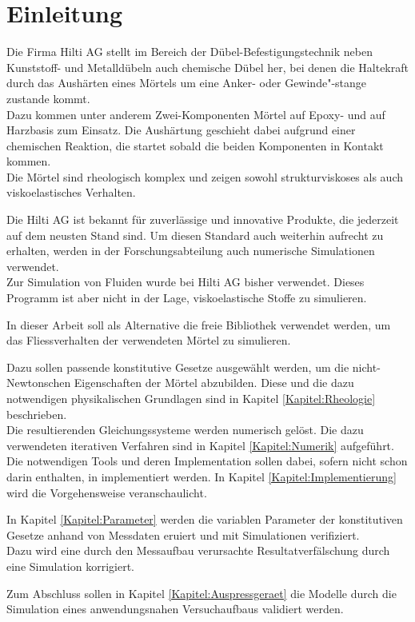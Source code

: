 \section{Einleitung}
\label{Kapitel:Einleitung}
Die Firma Hilti AG stellt im Bereich der Dübel-Befestigungstechnik neben Kunststoff- und Metalldübeln auch chemische Dübel her, bei denen die Haltekraft durch das Aushärten eines Mörtels um eine Anker- oder Gewinde"-stange zustande kommt. \\
Dazu kommen unter anderem Zwei-Komponenten Mörtel auf Epoxy- und auf Harzbasis zum Einsatz. Die Aushärtung geschieht dabei aufgrund einer chemischen Reaktion, die startet sobald die beiden Komponenten in Kontakt kommen.\\
Die Mörtel sind rheologisch komplex und zeigen sowohl strukturviskoses als auch viskoelastisches Verhalten.%

Die Hilti AG ist bekannt für zuverlässige und innovative Produkte, die jederzeit auf dem neusten Stand sind. Um diesen Standard auch weiterhin aufrecht zu erhalten, werden in der Forschungsabteilung auch numerische Simulationen verwendet.\\
Zur Simulation von Fluiden wurde bei Hilti AG bisher \cfx{} verwendet. Dieses Programm ist aber nicht in der Lage, viskoelastische Stoffe zu simulieren.%

In dieser Arbeit soll als Alternative die freie Bibliothek \openfoam{} verwendet werden, um das Fliessverhalten der verwendeten Mörtel zu simulieren.

Dazu sollen passende konstitutive Gesetze ausgewählt werden, um die nicht-Newtonschen Eigenschaften der Mörtel abzubilden. Diese und die dazu notwendigen physikalischen Grundlagen sind in Kapitel \ref{Kapitel:Rheologie} beschrieben.\\
Die resultierenden Gleichungssysteme werden numerisch gelöst. Die dazu verwendeten iterativen Verfahren sind in Kapitel \ref{Kapitel:Numerik} aufgeführt.
Die notwendigen Tools und deren Implementation sollen dabei, sofern nicht schon darin enthalten, in \openfoam{} implementiert werden. In Kapitel \ref{Kapitel:Implementierung} wird die Vorgehensweise veranschaulicht.

In Kapitel \ref{Kapitel:Parameter} werden die variablen Parameter der konstitutiven Gesetze anhand von Messdaten eruiert und mit Simulationen verifiziert.\\
Dazu wird eine durch den Messaufbau verursachte Resultatverfälschung durch eine Simulation korrigiert.

Zum Abschluss sollen in Kapitel \ref{Kapitel:Auspressgeraet} die Modelle durch die Simulation eines anwendungsnahen Versuchaufbaus validiert werden.
